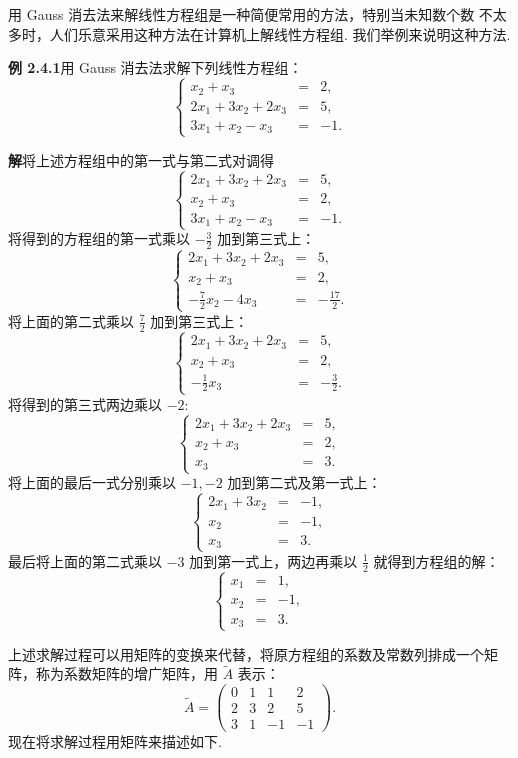 \documentclass[UTF8,12pt,a4paper,fontset=fandol]{ctexart}
\begin{document}
用 Gauss 消去法来解线性方程组是一种简便常用的方法，特别当未知数个数
不太多时，人们乐意采用这种方法在计算机上解线性方程组. 我们举例来说明这种方法.

\noindent\textbf{例 2.4.1}\quad 用 Gauss 消去法求解下列线性方程组：
\[
\left\{\begin{array}{rcl}
x_2+x_3&=&2,\\
2x_1+3x_2+2x_3&=&5,\\
3x_1+x_2-x_3&=&-1.
\end{array}\right.
\]

\noindent\textbf{解}\quad 将上述方程组中的第一式与第二式对调得
\[
\left\{\begin{array}{rcl}
2x_1+3x_2+2x_3&=&5,\\
x_2+x_3&=&2,\\
3x_1+x_2-x_3&=&-1.
\end{array}\right.
\]
将得到的方程组的第一式乘以 $-\frac{3}{2}$ 加到第三式上：
\[
\left\{\begin{array}{rcl}
2x_1+3x_2+2x_3&=&5,\\
x_2+x_3&=&2,\\
-\frac{7}{2}x_2-4x_3&=&-\frac{17}{2}.
\end{array}\right.
\]
将上面的第二式乘以 $\frac{7}{2}$ 加到第三式上：
\[
\left\{\begin{array}{rcl}
2x_1+3x_2+2x_3&=&5,\\
x_2+x_3&=&2,\\
-\frac{1}{2}x_3&=&-\frac{3}{2}.
\end{array}\right.
\]
将得到的第三式两边乘以 $-2$:
\[
\left\{\begin{array}{rcl}
2x_1+3x_2+2x_3&=&5,\\
x_2+x_3&=&2,\\
x_3&=&3.
\end{array}\right.
\]
将上面的最后一式分别乘以 $-1,-2$ 加到第二式及第一式上：
\[
\left\{\begin{array}{rcl}
2x_1+3x_2&=&-1,\\
x_2&=&-1,\\
x_3&=&3.
\end{array}\right.
\]
最后将上面的第二式乘以 $-3$ 加到第一式上，两边再乘以 $\frac{1}{2}$ 就得到方程组的解：
\[
\left\{\begin{array}{rcl}
x_1&=&1,\\
x_2&=&-1,\\
x_3&=&3.
\end{array}\right.
\]

上述求解过程可以用矩阵的变换来代替，将原方程组的系数及常数列排成一个矩阵，称为系数矩阵的增广矩阵，用 $\widetilde{A}$ 表示：
\[
\widetilde{A}=
\left(\begin{array}{cccc}
0 & 1 & 1 & 2\\
2 & 3 & 2 & 5\\
3 & 1 & -1 & -1
\end{array}\right).
\]
现在将求解过程用矩阵来描述如下.
\end{document}
